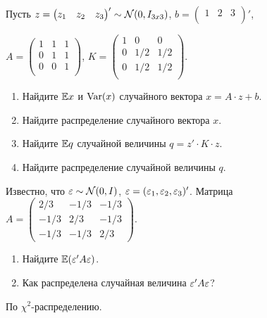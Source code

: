 \begin{problem}
Пусть $z =  \begin{pmatrix}
z_1 & z_2 & z_3\\
\end{pmatrix} ' \sim \mathcal{N}(0, I_{3x3})$, $b =  \begin{pmatrix}
1 & 2 & 3\\
\end{pmatrix} '$,

$A =  \begin{pmatrix}
1 & 1 & 1 \\
0 & 1 & 1 \\
0 & 0 & 1 \\
\end{pmatrix} $, $K =  \begin{pmatrix}
1 & 0 & 0 \\
0 & 1/2 & 1/2 \\
0 & 1/2 & 1/2 \\
\end{pmatrix} $.

\begin{enumerate}
\item Найдите $\mathbb{E} x$ и $\operatorname{Var} (x)$ случайного вектора $x = A \cdot z + b$.
\item Найдите распределение случайного вектора $x$.
\item Найдите $\mathbb{E} q$ случайной величины $q = z' \cdot K \cdot z$.
\item Найдите распределение случайной величины $q$.
\end{enumerate}


\begin{sol}
\end{sol}
\end{problem}



\begin{problem}
Известно, что $\varepsilon\sim \mathcal{N}(0,I)$, $\varepsilon=(\varepsilon_1,\varepsilon_2,\varepsilon_3)'$. Матрица $A=\left(\begin{matrix}
2/3 & -1/3 & -1/3 \\
-1/3 & 2/3 & -1/3 \\
-1/3 & -1/3 & 2/3
\end{matrix}\right)$.
\begin{enumerate}
\item Найдите $\mathbb{E}(\varepsilon'A\varepsilon)$.
\item Как распределена случайная величина $\varepsilon' A\varepsilon$?
\end{enumerate}


\begin{sol}
По $\chi^2$-распределению.
\end{sol}
\end{problem}



